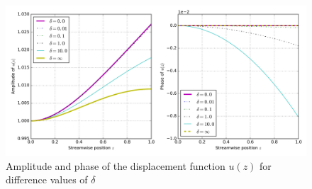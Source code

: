 \documentclass{article}
\begin{document}
\begin{figure}[!htbp]
    \centering
    \includegraphics[width=\textwidth]{./img_eig_asy/fig_sol_analytic_disp_fun.jpg}
    \caption{Amplitude and phase of the displacement function $u(z)$ for difference values of $\delta$ }
    \label{fig:fig_sol_analytic_disp_fun}
\end{figure}
\end{document}
